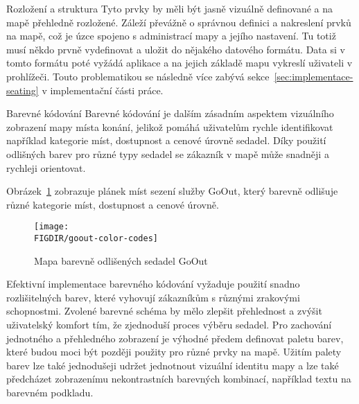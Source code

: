 \begin{subsection}{Rozložení a struktura}
    Tyto prvky by měli být jasně vizuálně definované a na mapě přehledně rozložené.
    Záleží převážně o správnou definici a nakreslení prvků na mapě, což je úzce spojeno s administrací mapy a jejího nastavení.
    Tu totiž musí někdo prvně vydefinovat a uložit do nějakého datového formátu.
    Data si v tomto formátu poté vyžádá aplikace a na jejich základě mapu vykreslí uživateli v prohlížeči.
    Touto problematikou se následně více zabývá sekce~\ref{sec:implementace-seating} v implementační části práce.
\end{subsection}

\begin{subsection}{Barevné kódování}
    \label{subsec:identifikace-interaktivni-mapa-barevne-kody}
    Barevné kódování je dalším zásadním aspektem vizuálního zobrazení mapy místa konání, jelikož pomáhá uživatelům rychle identifikovat například kategorie míst, dostupnost a cenové úrovně sedadel.
    Díky použití odlišných barev pro různé typy sedadel se zákazník v mapě může snadněji a rychleji orientovat.

    Obrázek~\ref{fig:goout-color-codes} zobrazuje plánek míst sezení služby GoOut, který barevně odlišuje různé kategorie míst, dostupnost a cenové úrovně.

    \begin{figure}[H]
        \texttt{[image: \\FIGDIR/goout-color-codes]}
        \centering
        \caption{Mapa barevně odlišených sedadel GoOut\cite{g__goout_net}}
        \label{fig:goout-color-codes}
    \end{figure}

    Efektivní implementace barevného kódování vyžaduje použití snadno rozlišitelných barev, které vyhovují zákazníkům s různými zrakovými schopnostmi.
    Zvolené barevné schéma by mělo zlepšit přehlednost a zvýšit uživatelský komfort tím, že zjednoduší proces výběru sedadel.
    Pro zachování jednotného a přehledného zobrazení je výhodné předem definovat paletu barev, které budou moci být později použity pro různé prvky na mapě.
    Užitím palety barev lze také jednodušeji udržet jednotnout vizuální identitu mapy a lze také předcházet zobrazenímu nekontrastních barevných kombinací, například textu na barevném podkladu.
\end{subsection}

